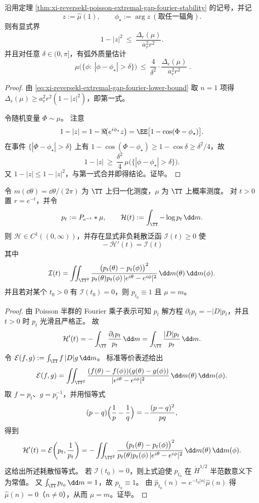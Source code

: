 \begin{proposition}[熵缺口诱导的定量聚集与弧外质量界]\label{prop:xi-reversekl-extremal-gap-concentration-arc}
沿用定理 \ref{thm:xi-reversekl-poisson-extremal-gap-fourier-stability} 的记号，并记
\[
z:=\widehat\mu(1),\qquad \phi_\star:=\arg z\ (\text{取任一辐角}).
\]
则有显式界
\[
1-|z|^2\ \le\ \frac{\Delta_r(\mu)}{a_r^2 r^2}.
\]
并且对任意 \(\delta\in(0,\pi]\)，有弧外质量估计
\[
\boxed{\;
\mu\bigl(\{\phi:\ |\phi-\phi_\star|>\delta\}\bigr)
\ \le\
\frac{4}{\delta^2}\cdot \frac{\Delta_r(\mu)}{a_r^2 r^2}\; }.
\]
\end{proposition}
\begin{proof}
由 \eqref{eq:xi-reversekl-extremal-gap-fourier-lower-bound} 取 \(n=1\) 项得
\(
\Delta_r(\mu)\ge a_r^2 r^2(1-|z|^2)
\)，即第一式。
\par
令随机变量 \(\Phi\sim\mu\)。
注意
\[
1-|z|
=1-\Re\!\bigl(e^{i\phi_\star}z\bigr)
=\EE\bigl[1-\cos(\Phi-\phi_\star)\bigr].
\]
在事件 \(\{|\Phi-\phi_\star|>\delta\}\) 上有 \(1-\cos(\Phi-\phi_\star)\ge 1-\cos\delta\ge \delta^2/4\)，故
\[
1-|z|\ \ge\ \frac{\delta^2}{4}\,\mu\bigl(\{|\phi-\phi_\star|>\delta\}\bigr).
\]
又 \(1-|z|\le 1-|z|^2\)，与第一式合并即得结论。证毕。
\end{proof}

\begin{theorem}\label{thm:xi-reversekl-poisson-semigroup-dissipation}
令 \(m(\dd\theta)=\dd\theta/(2\pi)\) 为 \(\TT\) 上归一化测度，\(\mu\) 为 \(\TT\) 上概率测度。
对 \(t>0\) 置 \(r=e^{-t}\)，并令
\[
p_t:=P_{e^{-t}}*\mu,\qquad
\mathcal H(t):=\int_{\TT}-\log p_t\,\dd m.
\]
则 \(\mathcal H\in C^1((0,\infty))\)，并存在显式非负耗散泛函 \(\mathcal I(t)\ge 0\) 使
\[
\boxed{\;-\mathcal H'(t)=\mathcal I(t)\;}
\]
其中
\[
\mathcal I(t)
=
\iint_{\TT^2}
\frac{\bigl(p_t(\theta)-p_t(\phi)\bigr)^2}
{p_t(\theta)p_t(\phi)\,|e^{i\theta}-e^{i\phi}|^2}\,\dd m(\theta)\,\dd m(\phi).
\]
并且若对某个 \(t_0>0\) 有 \(\mathcal I(t_0)=0\)，则 \(p_{t_0}\equiv 1\) 且 \(\mu=m\)。
\end{theorem}
\begin{proof}
由 Poisson 半群的 Fourier 乘子表示可知 \(p_t\) 解方程 \(\partial_t p_t=-|D|p_t\)，并且 \(t>0\) 时 \(p_t\) 光滑且严格正。
故
\[
\mathcal H'(t)
=-\int_{\TT}\frac{\partial_t p_t}{p_t}\,\dd m
=\int_{\TT}\frac{|D|p_t}{p_t}\,\dd m.
\]
令 \(\mathcal E(f,g):=\int_{\TT} f\,|D|g\,\dd m\)。
标准等价表述给出
\[
\mathcal E(f,g)
=\iint_{\TT^2}\frac{(f(\theta)-f(\phi))(g(\theta)-g(\phi))}{|e^{i\theta}-e^{i\phi}|^2}\,\dd m(\theta)\,\dd m(\phi).
\]
取 \(f=p_t\)、\(g=p_t^{-1}\)，并用恒等式
\[
(p-q)\Bigl(\frac1p-\frac1q\Bigr)=-\frac{(p-q)^2}{pq},
\]
得到
\[
\mathcal H'(t)
=\mathcal E\!\left(p_t,\frac1{p_t}\right)
=-\iint_{\TT^2}
\frac{\bigl(p_t(\theta)-p_t(\phi)\bigr)^2}{p_t(\theta)p_t(\phi)\,|e^{i\theta}-e^{i\phi}|^2}\,\dd m(\theta)\,\dd m(\phi).
\]
这给出所述耗散恒等式。
若 \(\mathcal I(t_0)=0\)，则上式迫使 \(p_{t_0}\) 在 \(\dot H^{1/2}\) 半范数意义下为常值。
又 \(\int_{\TT}p_{t_0}\,\dd m=1\)，故 \(p_{t_0}\equiv 1\)。
由 \(\widehat p_{t_0}(n)=e^{-t_0|n|}\widehat\mu(n)\) 得 \(\widehat\mu(n)=0\)（\(n\neq 0\)），从而 \(\mu=m\)。证毕。
\end{proof}

